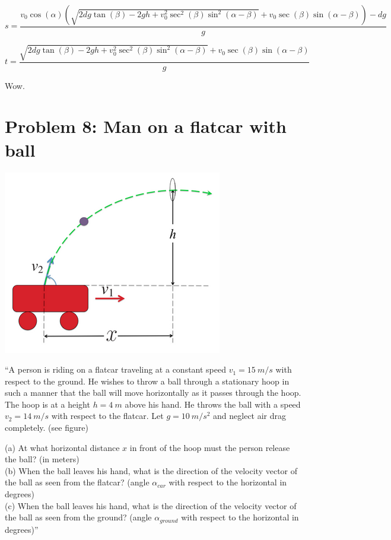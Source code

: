 \documentclass[8.01x]{subfiles}
\begin{document}
\begin{equation}
s = \frac{v_0 \cos (\alpha) \left(\sqrt{2 d g \tan (\beta) - 2 g h + v_0^2 \sec ^2(\beta) \sin^2(\alpha -\beta)} + v_0 \sec (\beta) \sin (\alpha - \beta)\right) - d g}{g}
\end{equation}

\begin{equation}
t = \frac{\sqrt{2 d g \tan (\beta) - 2 g h + v_0^2 \sec^2(\beta) \sin^2(\alpha - \beta)} + v_0 \sec(\beta) \sin (\alpha - \beta)}{g}
\end{equation}

Wow.

\section{Problem 8: Man on a flatcar with ball}

\begin{center}
\includegraphics[scale=0.6]{Graphics/midterm1p8}
\end{center}

``A person is riding on a flatcar traveling at a constant speed $v_1 = \SI{15}{m/s}$ with respect to the ground. He wishes to throw a ball through a stationary hoop in such a manner that the ball will move horizontally as it passes through the hoop. The hoop is at a height $h = \SI{4}{m}$ above his hand. He throws the ball with a speed $v_2 = \SI{14}{m/s}$ with respect to the flatcar. Let $g = \SI{10}{m/s^2}$ and neglect air drag completely. (see figure)

(a) At what horizontal distance $x$ in front of the hoop must the person release the ball? (in meters)\\
(b) When the ball leaves his hand, what is the direction of the velocity vector of the ball as seen from the flatcar? (angle $\alpha_{car}$ with respect to the horizontal in degrees)\\
(c) When the ball leaves his hand, what is the direction of the velocity vector of the ball as seen from the ground? (angle $\alpha_{ground}$ with respect to the horizontal in degrees)''
\end{document}
